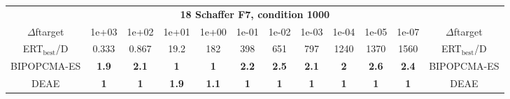 \begin{tabular}{cccccccccccc}
 & \multicolumn{10}{c}{{\normalsize \textbf{18 Schaffer F7, condition 1000}}}\\
$\Delta$ftarget& 1e+03& 1e+02& 1e+01& 1e+00& 1e-01& 1e-02& 1e-03& 1e-04& 1e-05& 1e-07 & $\Delta$ftarget \\
ERT$_{\textrm{best}}$/D& 0.333& 0.867& 19.2& 182& 398& 651& 797& 1240& 1370& 1560 & ERT$_{\textrm{best}}$/D \\
\hline
BIPOPCMA-ES & \textbf{1.9} & \textbf{2.1} & \textbf{1} & \textbf{1} & \textbf{2.2} & \textbf{2.5} & \textbf{2.1} & \textbf{2} & \textbf{2.6} & \textbf{2.4} & BIPOPCMA-ES \cite{add_an_entry_for_BIPOPCMA-ES_in_bbob.bib}\\
DEAE & \textbf{1} & \textbf{1} & \textbf{1.9} & \textbf{1.1} & \textbf{1} & \textbf{1} & \textbf{1} & \textbf{1} & \textbf{1} & \textbf{1} & DEAE \cite{add_an_entry_for_DEAE_in_bbob.bib}
\end{tabular}
